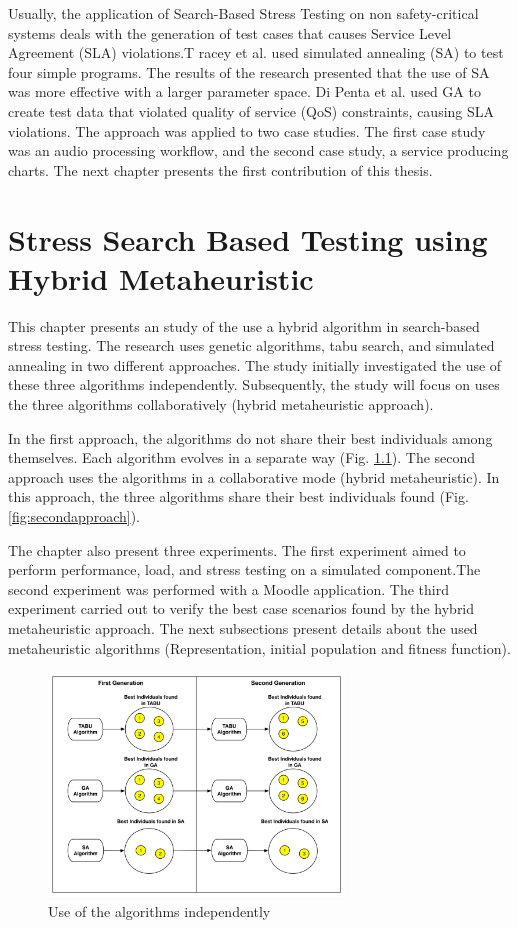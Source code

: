 \documentclass[espaco=umemeio,chapter=TITLE,twoside,openright]{abnt}
\begin{document}
Usually, the application of Search-Based Stress Testing on non safety-critical systems deals with the generation of test cases that causes Service Level Agreement (SLA) violations.T racey et al.  used simulated annealing (SA) to test four
simple programs. The results of the research presented that the use of SA was more effective with a larger parameter space. Di Penta et al. used GA to create test data that violated quality of service (QoS) constraints, causing SLA violations. The approach was applied to two case studies. The first case study was an audio processing workflow, and the second case study, a service producing charts. The next chapter presents the first contribution of this thesis.

\chapter{Stress Search Based Testing using Hybrid Metaheuristic}

This chapter presents an study of the use a hybrid algorithm in search-based stress testing. The research uses genetic algorithms, tabu search, and simulated annealing in two different approaches. The study initially investigated the use of these three algorithms independently. Subsequently, the study will focus on  uses the three algorithms collaboratively (hybrid metaheuristic approach).

In the first approach, the algorithms do not share their best individuals among themselves. Each algorithm evolves in a separate way (Fig. \ref{fig:firstaproach}). The second approach uses the algorithms in a collaborative mode (hybrid metaheuristic). In this approach, the three algorithms share their best individuals found (Fig. \ref{fig:secondapproach}). 


The chapter also present three experiments. The first experiment aimed to perform performance, load, and stress testing on a simulated component.The second experiment was performed with a Moodle application. The third experiment carried out to verify the best case scenarios found by the hybrid metaheuristic approach.  The next subsections present details about the used metaheuristic algorithms (Representation, initial population and fitness function).

\begin{figure}[h]
\centering
\includegraphics[width=0.7\textwidth]{./images/independ.png}
\caption{Use of the algorithms independently \cite{Gois2016}}
\label{fig:firstaproach}
\end{figure}
\end{document}
